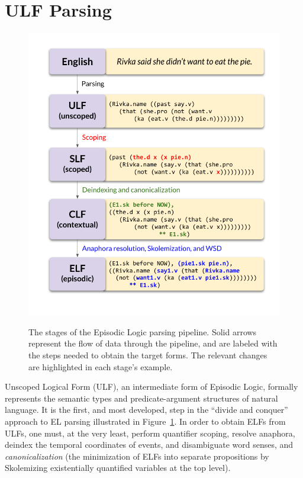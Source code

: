 \section{ULF Parsing}

\begin{figure}
\includegraphics{CH2_el/el_pipeline.pdf}
\label{fig:el_pipeline}
\caption{The stages of the Episodic Logic parsing pipeline. Solid arrows represent the flow of data through the pipeline, and are labeled with the steps needed to obtain the target forms. The relevant changes are highlighted in each stage's example.}
\end{figure}

\label{subsec:ulf}
Unscoped Logical Form (ULF), an intermediate form of Episodic Logic, formally represents the semantic types and predicate-argument structures of natural language. It is the first, and most developed, step in the ``divide and conquer'' approach to EL parsing illustrated in Figure~\ref{fig:el_pipeline}. In order to obtain ELFs from ULFs, one must, at the very least, perform quantifier scoping, resolve anaphora, deindex the temporal coordinates of events, and disambiguate word senses, and \textit{canonicalization} (the minimization of ELFs into separate propositions by Skolemizing existentially quantified variables at the top level).

